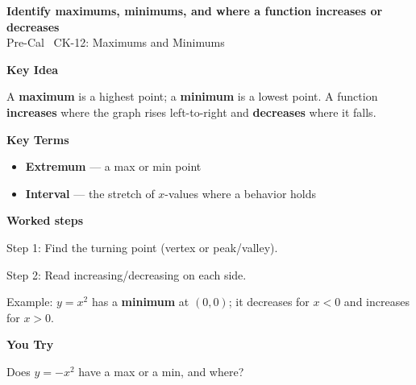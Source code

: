 \documentclass[12pt]{article}
\begin{document}
\begin{center}{\Large \textbf{Identify maximums, minimums, and where a function increases or decreases}}\\[2pt]{\small Pre-Cal \textbar\ CK-12: Maximums and Minimums}\end{center}\vspace{0.25cm}

{\large\textbf{Key Idea}}\par\smallskip
A \textbf{maximum} is a highest point; a \textbf{minimum} is a lowest point. A function \textbf{increases} where the graph rises left-to-right and \textbf{decreases} where it falls.\par


{\large\textbf{Key Terms}}\par\smallskip
\begin{itemize}[leftmargin=1.4em]
  \item \textbf{Extremum} — a max or min point
  \item \textbf{Interval} — the stretch of $x$-values where a behavior holds
\end{itemize}


{\large\textbf{Worked steps}}\par\smallskip
Step 1: Find the turning point (vertex or peak/valley).\par
Step 2: Read increasing/decreasing on each side.\par
Example: $y=x^2$ has a \textbf{minimum} at $(0,0)$; it decreases for $x<0$ and increases for $x>0$.\par


{\large\textbf{You Try}}\par\smallskip
Does $y=-x^2$ have a max or a min, and where?\par
\end{document}

